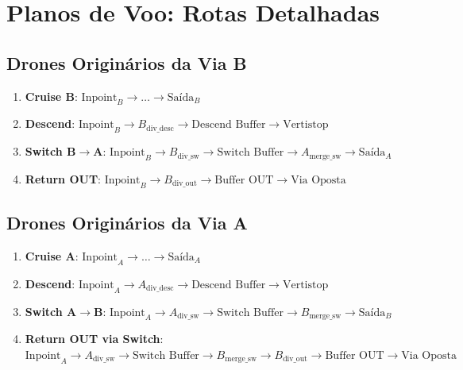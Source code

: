 \documentclass[12pt,a4paper]{article}
\begin{document}
\section{Planos de Voo: Rotas Detalhadas}
\label{sec:rotas}

\subsection{Drones Originários da Via B}
\begin{enumerate}
    \item \textbf{Cruise B}: $\text{Inpoint}_B \to \dots \to \text{Saída}_B$
    \item \textbf{Descend}: $\text{Inpoint}_B \to B_{\text{div\_desc}} \to \text{Descend Buffer} \to \text{Vertistop}$
    \item \textbf{Switch B$\to$A}: $\text{Inpoint}_B \to B_{\text{div\_sw}} \to \text{Switch Buffer} \to A_{\text{merge\_sw}} \to \text{Saída}_A$
    \item \textbf{Return OUT}: $\text{Inpoint}_B \to B_{\text{div\_out}} \to \text{Buffer OUT} \to \text{Via Oposta}$
\end{enumerate}

\subsection{Drones Originários da Via A}
\begin{enumerate}[resume]
    \item \textbf{Cruise A}: $\text{Inpoint}_A \to \dots \to \text{Saída}_A$
    \item \textbf{Descend}: $\text{Inpoint}_A \to A_{\text{div\_desc}} \to \text{Descend Buffer} \to \text{Vertistop}$
    \item \textbf{Switch A$\to$B}: $\text{Inpoint}_A \to A_{\text{div\_sw}} \to \text{Switch Buffer} \to B_{\text{merge\_sw}} \to \text{Saída}_B$
    \item \textbf{Return OUT via Switch}: $\text{Inpoint}_A \to A_{\text{div\_sw}} \to \text{Switch Buffer} \to B_{\text{merge\_sw}} \to B_{\text{div\_out}} \to \text{Buffer OUT} \to \text{Via Oposta}$
\end{enumerate}
\end{document}

